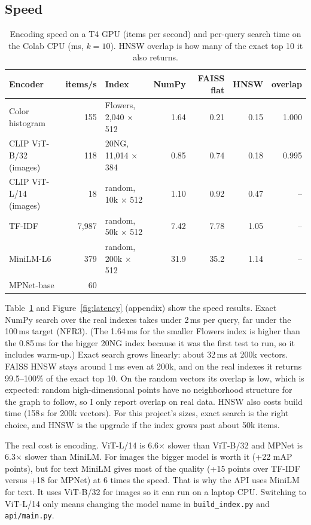 \documentclass{article}
\begin{document}
\subsection{Speed}

\begin{table}[h]
\centering\small
\caption{Encoding speed on a T4 GPU (items per second) and per-query search time on the Colab CPU (ms, $k=10$). HNSW overlap is how many of the exact top 10 it also returns.}
\label{tab:speed}
\begin{tabular}{@{}lr@{\hspace{2em}}lrrrr@{}}
\toprule
Encoder & items/s & Index & NumPy & FAISS flat & HNSW & overlap \\
\midrule
Color histogram & 155 & Flowers, 2,040 $\times$ 512 & 1.64 & 0.21 & 0.15 & 1.000 \\
CLIP ViT-B/32 (images) & 118 & 20NG, 11,014 $\times$ 384 & 0.85 & 0.74 & 0.18 & 0.995 \\
CLIP ViT-L/14 (images) & 18 & random, 10k $\times$ 512 & 1.10 & 0.92 & 0.47 & -- \\
TF-IDF & 7,987 & random, 50k $\times$ 512 & 7.42 & 7.78 & 1.05 & -- \\
MiniLM-L6 & 379 & random, 200k $\times$ 512 & 31.9 & 35.2 & 1.14 & -- \\
MPNet-base & 60 & & & & & \\
\bottomrule
\end{tabular}
\end{table}

Table~\ref{tab:speed} and Figure~\ref{fig:latency} (appendix) show the speed results. Exact NumPy search over the real indexes takes under 2\,ms per query, far under the 100\,ms target (NFR3). (The 1.64\,ms for the smaller Flowers index is higher than the 0.85\,ms for the bigger 20NG index because it was the first test to run, so it includes warm-up.) Exact search grows linearly: about 32\,ms at 200k vectors. FAISS HNSW stays around 1\,ms even at 200k, and on the real indexes it returns 99.5--100\% of the exact top 10. On the random vectors its overlap is low, which is expected: random high-dimensional points have no neighborhood structure for the graph to follow, so I only report overlap on real data. HNSW also costs build time (158\,s for 200k vectors). For this project's sizes, exact search is the right choice, and HNSW is the upgrade if the index grows past about 50k items.

The real cost is encoding. ViT-L/14 is 6.6$\times$ slower than ViT-B/32 and MPNet is 6.3$\times$ slower than MiniLM. For images the bigger model is worth it (+22 mAP points), but for text MiniLM gives most of the quality (+15 points over TF-IDF versus +18 for MPNet) at 6 times the speed. That is why the API uses MiniLM for text. It uses ViT-B/32 for images so it can run on a laptop CPU. Switching to ViT-L/14 only means changing the model name in \texttt{build\_index.py} and \texttt{api/main.py}.
\end{document}
